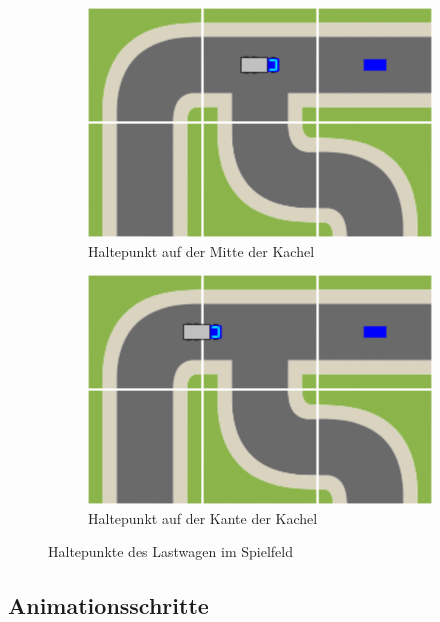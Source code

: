 \begin{figure}
  \begin{subfigure}[b]{0.45\textwidth}
    \includegraphics[width=\textwidth]{gfx/implementation-rendering-truck-A.png}
    \caption{Haltepunkt auf der Mitte der Kachel}
    \label{fig:implementation:rendering:truck:a}
  \end{subfigure}\hfill
  \begin{subfigure}[b]{0.45\textwidth}
    \includegraphics[width=\textwidth]{gfx/implementation-rendering-truck-B.png}
    \caption{Haltepunkt auf der Kante der Kachel}
    \label{fig:implementation:rendering:truck:b}
  \end{subfigure}\hfill
  \caption{Haltepunkte des Lastwagen im Spielfeld}
  \label{fig:implementation:rendering:truck}
\end{figure}

\subsection{Animationsschritte}

